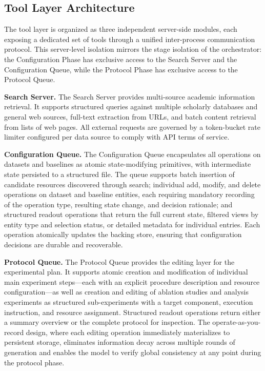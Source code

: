 \subsection{Tool Layer Architecture}

The tool layer is organized as three independent server-side modules, each exposing a dedicated set of tools through a unified inter-process communication protocol. This server-level isolation mirrors the stage isolation of the orchestrator: the Configuration Phase has exclusive access to the Search Server and the Configuration Queue, while the Protocol Phase has exclusive access to the Protocol Queue.

\textbf{Search Server.} The Search Server provides multi-source academic information retrieval. It supports structured queries against multiple scholarly databases and general web sources, full-text extraction from URLs, and batch content retrieval from lists of web pages. All external requests are governed by a token-bucket rate limiter configured per data source to comply with API terms of service.

\textbf{Configuration Queue.} The Configuration Queue encapsulates all operations on datasets and baselines as atomic state-modifying primitives, with intermediate state persisted to a structured file. The queue supports batch insertion of candidate resources discovered through search; individual add, modify, and delete operations on dataset and baseline entities, each requiring mandatory recording of the operation type, resulting state change, and decision rationale; and structured readout operations that return the full current state, filtered views by entity type and selection status, or detailed metadata for individual entries. Each operation atomically updates the backing store, ensuring that configuration decisions are durable and recoverable.

\textbf{Protocol Queue.} The Protocol Queue provides the editing layer for the experimental plan. It supports atomic creation and modification of individual main experiment steps---each with an explicit procedure description and resource configuration---as well as creation and editing of ablation studies and analysis experiments as structured sub-experiments with a target component, execution instruction, and resource assignment. Structured readout operations return either a summary overview or the complete protocol for inspection. The operate-as-you-record design, where each editing operation immediately materializes to persistent storage, eliminates information decay across multiple rounds of generation and enables the model to verify global consistency at any point during the protocol phase.


